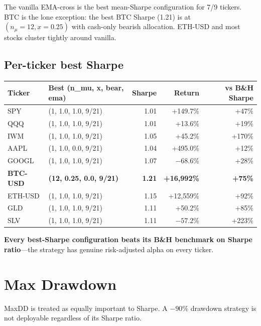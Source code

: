 \documentclass[11pt,a4paper]{article}
\begin{document}
The vanilla EMA-cross is the best mean-Sharpe configuration for 7/9 tickers. BTC is the lone exception: the best BTC Sharpe (1.21) is at $(n_\mu=12, x=0.25)$ with cash-only bearish allocation. ETH-USD and most stocks cluster tightly around vanilla.

\subsection{Per-ticker best Sharpe}

\begin{center}
\small
\begin{tabular}{llrrr}
\toprule
\textbf{Ticker} & \textbf{Best (n\_mu, x, bear, ema)} & \textbf{Sharpe} & \textbf{Return} & \textbf{vs B\&H Sharpe} \\
\midrule
SPY     & (1, 1.0, 1.0, 9/21) & 1.01 & +149.7\%  & +47\% \\
QQQ     & (1, 1.0, 1.0, 9/21) & 1.01 & +13.6\%   & +19\% \\
IWM     & (1, 1.0, 1.0, 9/21) & 1.05 & +45.2\%   & +170\% \\
AAPL    & (1, 1.0, 0.0, 9/21) & 1.04 & +495.0\%  & +12\% \\
GOOGL   & (1, 1.0, 1.0, 9/21) & 1.07 & $-68.6$\% & +28\% \\
\textbf{BTC-USD} & \textbf{(12, 0.25, 0.0, 9/21)} & \textbf{1.21} & \textbf{+16{,}992\%} & \textbf{+75\%} \\
ETH-USD & (1, 1.0, 1.0, 9/21) & 1.15 & +12{,}559\% & +92\% \\
GLD     & (1, 1.0, 1.0, 9/21) & 1.11 & +50.2\%   & +85\% \\
SLV     & (1, 1.0, 1.0, 9/21) & 1.11 & $-57.2$\% & +223\% \\
\bottomrule
\end{tabular}
\end{center}

\textbf{Every best-Sharpe configuration beats its B\&H benchmark on Sharpe ratio}---the strategy has genuine risk-adjusted alpha on every ticker.

\section{Max Drawdown}

MaxDD is treated as equally important to Sharpe. A $-90\%$ drawdown strategy is not deployable regardless of its Sharpe ratio.
\end{document}
